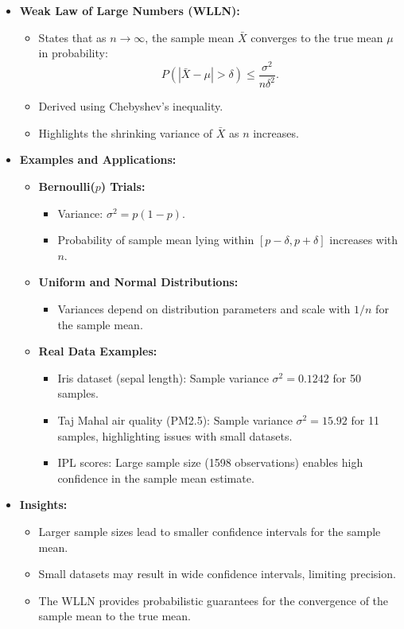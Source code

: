 \documentclass{article}
\begin{document}
\begin{itemize}
  \item \textbf{Weak Law of Large Numbers (WLLN):}
    \begin{itemize}
      \item States that as $n \to \infty$, the sample mean $\bar{X}$ converges to the true mean $\mu$ in probability:
        \[
          P(|\bar{X} - \mu| > \delta) \leq \frac{\sigma^2}{n \delta^2}.
        \]
      \item Derived using Chebyshev's inequality.
      \item Highlights the shrinking variance of $\bar{X}$ as $n$ increases.
    \end{itemize}

  \item \textbf{Examples and Applications:}
    \begin{itemize}
      \item \textbf{Bernoulli($p$) Trials:}
        \begin{itemize}
          \item Variance: $\sigma^2 = p(1-p)$.
          \item Probability of sample mean lying within $[p - \delta, p + \delta]$ increases with $n$.
        \end{itemize}
      \item \textbf{Uniform and Normal Distributions:}
        \begin{itemize}
          \item Variances depend on distribution parameters and scale with $1/n$ for the sample mean.
        \end{itemize}
      \item \textbf{Real Data Examples:}
        \begin{itemize}
          \item Iris dataset (sepal length): Sample variance $\sigma^2 = 0.1242$ for 50 samples.
          \item Taj Mahal air quality (PM2.5): Sample variance $\sigma^2 = 15.92$ for 11 samples, highlighting issues with small datasets.
          \item IPL scores: Large sample size (1598 observations) enables high confidence in the sample mean estimate.
        \end{itemize}
    \end{itemize}

  \item \textbf{Insights:}
    \begin{itemize}
      \item Larger sample sizes lead to smaller confidence intervals for the sample mean.
      \item Small datasets may result in wide confidence intervals, limiting precision.
      \item The WLLN provides probabilistic guarantees for the convergence of the sample mean to the true mean.
    \end{itemize}
\end{itemize}
\end{document}
